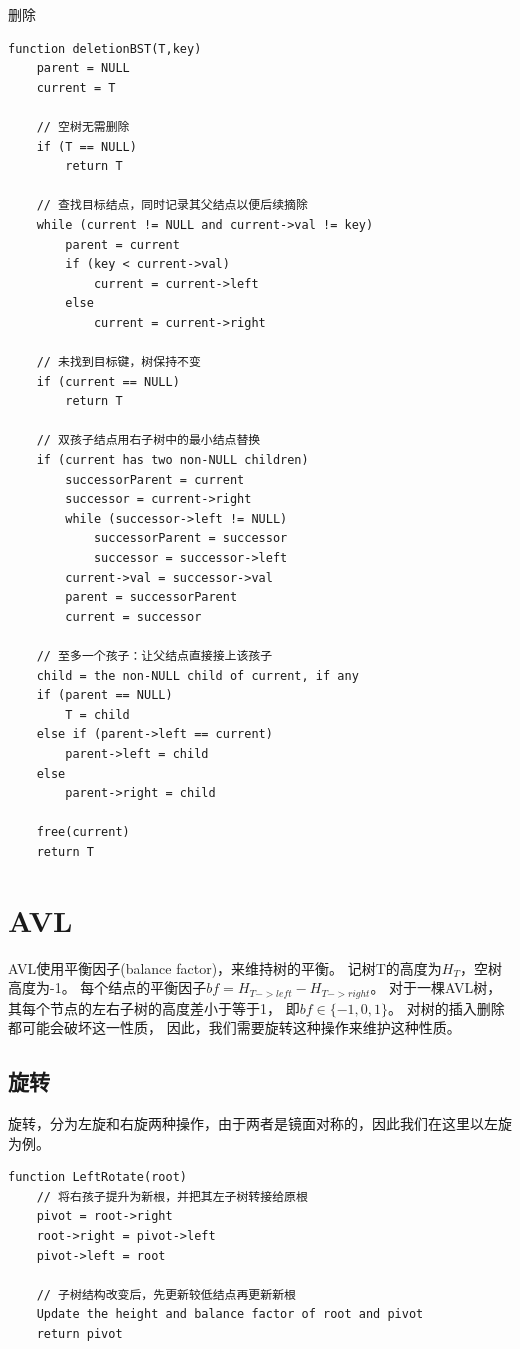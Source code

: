 \documentclass[openany]{book}
\begin{document}
删除
\begin{lstlisting}
function deletionBST(T,key)
    parent = NULL
    current = T

    // 空树无需删除
    if (T == NULL)
        return T

    // 查找目标结点，同时记录其父结点以便后续摘除
    while (current != NULL and current->val != key)
        parent = current
        if (key < current->val)
            current = current->left
        else
            current = current->right

    // 未找到目标键，树保持不变
    if (current == NULL)
        return T

    // 双孩子结点用右子树中的最小结点替换
    if (current has two non-NULL children)
        successorParent = current
        successor = current->right
        while (successor->left != NULL)
            successorParent = successor
            successor = successor->left
        current->val = successor->val
        parent = successorParent
        current = successor

    // 至多一个孩子：让父结点直接接上该孩子
    child = the non-NULL child of current, if any
    if (parent == NULL)
        T = child
    else if (parent->left == current)
        parent->left = child
    else
        parent->right = child

    free(current)
    return T
\end{lstlisting}

\section{AVL}
AVL使用平衡因子(balance factor)，来维持树的平衡。
记树T的高度为$H_T$，空树高度为-1。
每个结点的平衡因子$bf=H_{T->left}-H_{T->right}$。
对于一棵AVL树，其每个节点的左右子树的高度差小于等于1，
即$bf \in \{-1,0,1\}$。
对树的插入删除都可能会破坏这一性质，
因此，我们需要旋转这种操作来维护这种性质。

\subsection{旋转}
旋转，分为左旋和右旋两种操作，由于两者是镜面对称的，因此我们在这里以左旋为例。
\begin{lstlisting}
function LeftRotate(root)
    // 将右孩子提升为新根，并把其左子树转接给原根
    pivot = root->right
    root->right = pivot->left
    pivot->left = root

    // 子树结构改变后，先更新较低结点再更新新根
    Update the height and balance factor of root and pivot
    return pivot
\end{lstlisting}
\end{document}
